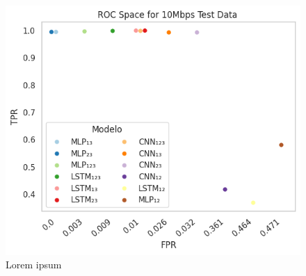 \begin{subfigure}{0.25\textwidth}
	\centering
	\includegraphics[width=1.0\textwidth]{./figs/ROC-Space-Test-Data-10Mbps.png}
	\caption{Lorem ipsum}
\end{subfigure}







